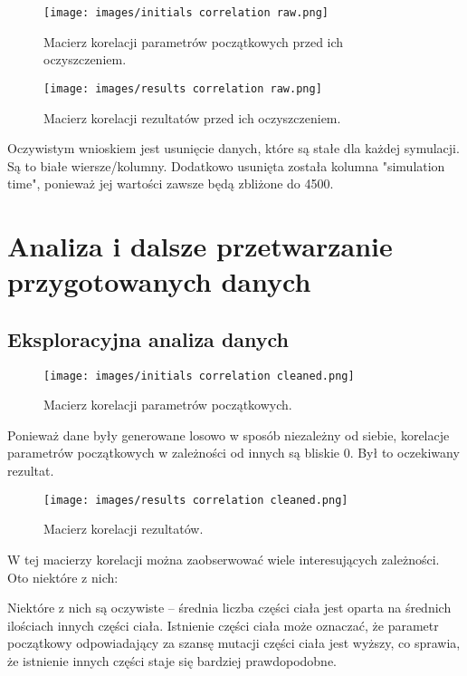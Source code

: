 \documentclass{article}
\begin{document}
\begin{figure}[H]
    \centering
    \texttt{[image: images/initials correlation raw.png]}
    \caption{Macierz korelacji parametrów początkowych przed ich oczyszczeniem.}
\end{figure}

\begin{figure}[H]
    \centering
    \texttt{[image: images/results correlation raw.png]}
    \caption{Macierz korelacji rezultatów przed ich oczyszczeniem.}
\end{figure}

Oczywistym wnioskiem jest usunięcie danych, które są stałe dla każdej symulacji. Są to białe wiersze/kolumny. Dodatkowo usunięta została kolumna "simulation time", ponieważ jej wartości zawsze będą zbliżone do 4500.

\section{Analiza i dalsze przetwarzanie przygotowanych danych}

\subsection{Eksploracyjna analiza danych}
\begin{figure}[H]
    \centering
    \texttt{[image: images/initials correlation cleaned.png]}
    \caption{Macierz korelacji parametrów początkowych.}
\end{figure}

Ponieważ dane były generowane losowo w sposób niezależny od siebie, korelacje parametrów początkowych w zależności od innych są bliskie 0. Był to oczekiwany rezultat.

\begin{figure}[H]
    \centering
    \texttt{[image: images/results correlation cleaned.png]}
    \caption{Macierz korelacji rezultatów.}
\end{figure}

W tej macierzy korelacji można zaobserwować wiele interesujących zależności. Oto niektóre z nich:

Niektóre z nich są oczywiste – średnia liczba części ciała jest oparta na średnich ilościach innych części ciała. Istnienie części ciała może oznaczać, że parametr początkowy odpowiadający za szansę mutacji części ciała jest wyższy, co sprawia, że istnienie innych części staje się bardziej prawdopodobne.
\end{document}
